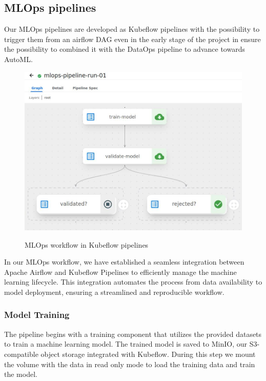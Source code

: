 \subsection{MLOps pipelines}\label{subsec:mlops-pipelines}
Our MLOps pipelines are developed as Kubeflow pipelines with the possibility to trigger them from an airflow DAG
even in the early stage of the project in ensure the possibility to combined it with the DataOps pipeline to advance towards AutoML.

\begin{figure}[!htbp]
    \centering
    \caption{MLOps workflow in Kubeflow pipelines}
    \includegraphics[scale=0.3]{images/project/mlops-workflow-kubeflow}
    \label{fig:mlops-workflow-kubeflow}
\end{figure}

In our MLOps workflow, we have established a seamless integration between Apache Airflow and Kubeflow Pipelines to
efficiently manage the machine learning lifecycle.
This integration automates the process from data availability to model deployment, ensuring a streamlined and reproducible workflow.


\subsubsection{Model Training}
The pipeline begins with a training component that utilizes the provided datasets to train a machine learning model.
The trained model is saved to MinIO, our S3-compatible object storage integrated with Kubeflow.
During this step we mount the volume with the data in read only mode to load the training data and train the model.

